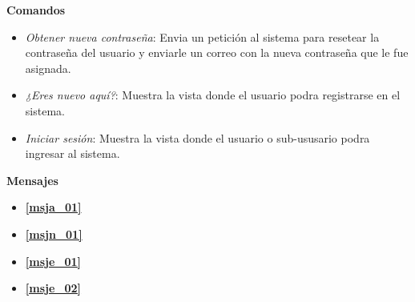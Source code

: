   \textbf{Comandos}
    \begin{itemize}
      \item \textit{Obtener nueva contraseña}: Envia un petición al sistema para resetear la contraseña del usuario y enviarle un correo con la nueva contraseña que le fue asignada.
      \item \textit{¿Eres nuevo aquí?}: Muestra la vista \textbf{} donde el usuario podra registrarse en el sistema.
      \item \textit{Iniciar sesión}: Muestra la vista \textbf{} donde el usuario o sub-ususario podra ingresar al sistema.
    \end{itemize}
\textbf{Mensajes}
  \begin{itemize}
     \item \textbf{\ref{msja_01}}
     \item \textbf{\ref{msjn_01}}
     \item \textbf{\ref{msje_01}}
     \item \textbf{\ref{msje_02}}
  \end{itemize}
  
  
